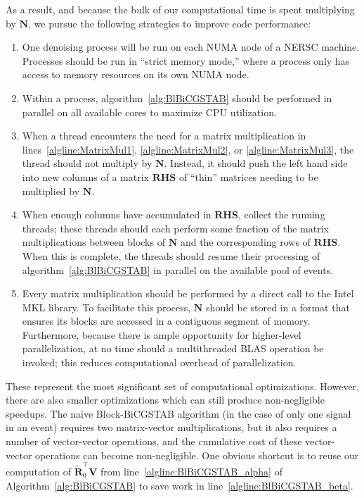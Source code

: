 As a result, and because the bulk of our computational time is spent multiplying by $\mathbf{N}$, we pursue the following strategies to improve code performance:
\begin{enumerate}
\item One denoising process will be run on each NUMA node of a NERSC machine.  Processes should be run in ``strict memory mode,'' where a process only has access to memory resources on its own NUMA node.
\item Within a process, algorithm~\ref{alg:BlBiCGSTAB} should be performed in parallel on all available cores to maximize CPU utilization.
\item When a thread encounters the need for a matrix multiplication in lines~\ref{algline:MatrixMul1}, \ref{algline:MatrixMul2}, or \ref{algline:MatrixMul3}, the thread should not multiply by $\mathbf{N}$.  Instead, it should push the left hand side into new columns of a matrix $\mathbf{RHS}$ of ``thin'' matrices needing to be multiplied by $\mathbf{N}$.
\item When enough columns have accumulated in $\mathbf{RHS}$, collect the running threads; these threads should each perform some fraction of the matrix multiplications between blocks of $\mathbf{N}$ and the corresponding rows of $\mathbf{RHS}$.  When this is complete, the threads should resume their processing of algorithm~\ref{alg:BlBiCGSTAB} in parallel on the available pool of events.
\item Every matrix multiplication should be performed by a direct call to the Intel MKL library.  To facilitate this process, $\mathbf{N}$ should be stored in a format that ensures its blocks are accessed in a contiguous segment of memory.  Furthermore, because there is ample opportunity for higher-level parallelization, at no time should a multithreaded BLAS operation be invoked; this reduces computational overhead of parallelization.
\end{enumerate}

These represent the most significant set of computational optimizations.  However, there are also smaller optimizations which can still produce non-negligible speedups.  The naive Block-BiCGSTAB algorithm (in the case of only one signal in an event) requires two matrix-vector multiplications, but it also requires a number of vector-vector operations, and the cumulative cost of these vector-vector operations can become non-negligible.  One obvious shortcut is to reuse our computation of $\mathbf{\widetilde{R}}_0^\top \mathbf{V}$ from line~\ref{algline:BlBiCGSTAB_alpha} of Algorithm~\ref{alg:BlBiCGSTAB} to save work in line~\ref{algline:BlBiCGSTAB_beta}.

